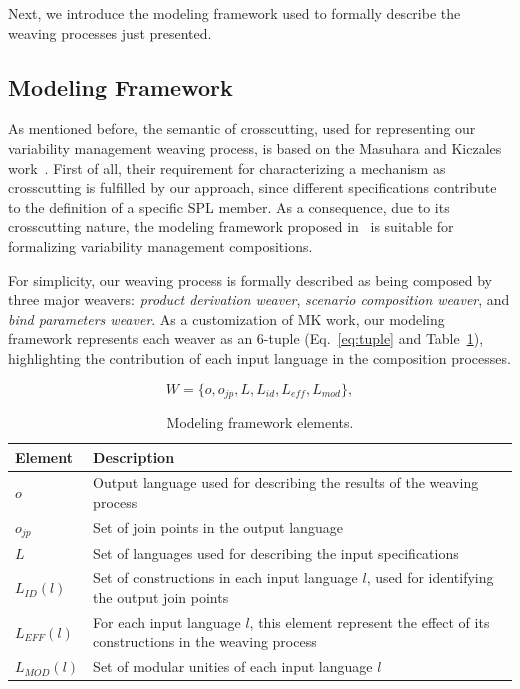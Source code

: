 \documentclass{acm_proc_article-sp}
\begin{document}
Next, we introduce the modeling framework used to formally describe the weaving processes just presented. 


\subsection{Modeling Framework}\label{sub:modeling-framework}

As mentioned before, the semantic of crosscutting, used for representing our variability management weaving process, is based on the Masuhara and Kiczales work~\cite{kiczales-ecoop-2003}. First of all, their requirement for characterizing a mechanism as crosscutting is fulfilled by our approach, since different specifications contribute to the definition of a specific SPL member. As a consequence, due to its crosscutting nature, the modeling framework proposed in~\cite{kiczales-ecoop-2003}  is suitable for formalizing variability management compositions. 

For simplicity, our weaving process is formally described as being composed by three major weavers: \emph{product derivation weaver}, \emph{scenario composition weaver}, and \emph{bind parameters weaver}. As a customization of MK work, our modeling framework represents each weaver as an 6-tuple (Eq.~\ref{eq:tuple} and Table~\ref{tab:tup-01}), highlighting the contribution of each input language in the composition processes. 

\begin{equation}
W = \{o, o_{jp}, L, L_{id}, L_{eff}, L_{mod}\}, 
\label{eq:tuple}
\end{equation}

\begin{table}[h]
\begin{center}
\caption{Modeling framework elements.} \label{tab:tup-01}
\begin{tabular}{|p{0.6in}|p{2.4in}|}
  \hline
  {\bf Element} & {\bf Description} \\ 
   \hline
  $o$              & Output language used for describing the results of the weaving process \\ \hline
  $o_{jp}$       & Set of join points in the output language \\ \hline
  $L$              & Set of languages used for describing the input specifications \\ \hline
  $L_{ID}(l)$      & Set of constructions in each input language $l$, used for identifying the output join points \\ \hline 
  $L_{EFF}(l)$   & For each input language $l$, this element represent the effect of its constructions in the weaving process \\ \hline
  $L_{MOD}(l)$  & Set of modular unities of each input language $l$\\ \hline
  \hline
\end{tabular}
\end{center}
\end{table}
\end{document}
